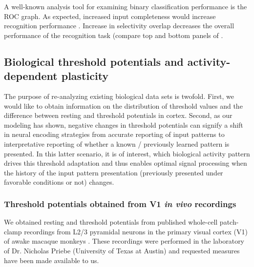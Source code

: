 A well-known analysis tool for examining binary classification performance is the ROC graph.
    As expected,
        increased input completeness
        would increase recognition performance
        .
    Increase in selectivity overlap decreases the overall performance of the recognition task
        (compare top and bottom panels of
        .

\subsection{Biological threshold potentials and activity-dependent plasticity}

The purpose of re-analyzing existing biological data sets is twofold.
    First, we would like to obtain information on the distribution of threshold values
        and the difference between resting and threshold potentials in cortex.
    Second, as our modeling has shown, negative changes in threshold potentials
        can signify a shift in neural encoding strategies
        from accurate reporting of input patterns
        to interpretative reporting of whether a known / previously learned pattern is presented.
    In this latter scenario, it is of interest,
        which biological activity pattern drives this threshold adaptation
        and thus enables optimal signal processing
        when the history of the input pattern presentation (previously presented under favorable conditions or not) changes.

\subsubsection*{Threshold potentials obtained from V1 \textit{in vivo} recordings}

We obtained resting and threshold potentials
        from published whole-cell patch-clamp recordings
        from L2/3 pyramidal neurons in the primary visual cortex (V1)
        of awake macaque monkeys \citep{Li2020-ej}.
    These recordings were performed
        in the laboratory of Dr. Nicholas Priebe (University of Texas at Austin)
        and requested measures have been made available to us.

